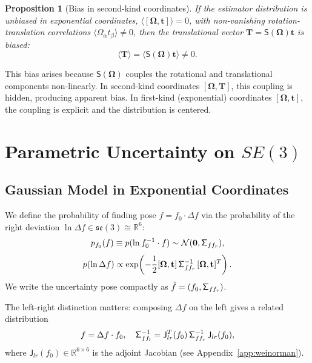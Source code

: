 \documentclass[journal]{IEEEtran}
\newcommand{\real}{\mathbb{R}}
\newcommand{\bfOmega}{\boldsymbol{\Omega}}
\newcommand{\sfSigma}[1]{\mathsf{\Sigma}_\mathnormal{#1}}
\newcommand{\beq}{\begin{equation}}
\newcommand{\eeq}{\end{equation}}
\newtheorem{proposition}{Proposition}
\begin{document}
\begin{proposition}[Bias in second-kind coordinates]
\label{prop:bias}
If the estimator distribution is unbiased in exponential 
coordinates, $\langle [\bfOmega, \mathbf{t}] \rangle = 0$, 
with non-vanishing rotation-translation correlations 
$\langle \Omega_\alpha t_\beta \rangle \neq 0$, then 
the translational vector $\mathbf{T} = \mathsf{S}(\bfOmega)\mathbf{t}$ 
is biased:
\beq
    \langle \mathbf{T} \rangle = 
    \langle \mathsf{S}(\bfOmega)\mathbf{t} \rangle \neq 0.
    \label{eq:biasmechanism}
\eeq
\end{proposition}

This bias arises because $\mathsf{S}(\bfOmega)$ couples 
the rotational and translational components non-linearly. 
In second-kind coordinates $[\bfOmega, \mathbf{T}]$, 
this coupling is hidden, producing apparent bias. 
In first-kind (exponential) coordinates $[\bfOmega, \mathbf{t}]$, 
the coupling is explicit and the distribution is centered.

\section{Parametric Uncertainty on $SE(3)$}
\label{sec:uncertainty}

\subsection{Gaussian Model in Exponential Coordinates}

We define the probability of finding pose $f = f_0 \cdot \Delta f$ 
via the probability of the right deviation 
$\ln \Delta f \in \mathfrak{se}(3) \cong \real^6$:
\beq
    p_{f_0}(f) \equiv p(\ln f_0^{-1} \cdot f) \sim 
    \mathcal{N}(\mathbf{0}, \sfSigma{ff_r}),
    \label{eq:gaussianSE3}
\eeq
\beq
    p(\ln \Delta f) \propto 
    \exp\!\left(-\frac{1}{2}[\bfOmega, \mathbf{t}]\,
    \sfSigma{ff_r}^{-1}\, [\bfOmega, \mathbf{t}]^T\right).
    \label{eq:gaussexplicit}
\eeq
We write the uncertainty pose compactly as 
$\hat{f} = (f_0, \sfSigma{ff_r})$.

The left-right distinction matters: composing 
$\Delta f$ on the left gives a related distribution
\beq
    f = \Delta f \cdot f_0,\quad
    \sfSigma{ff_l}^{-1} = \mathsf{J}_{lr}^T(f_0)\,
    \sfSigma{ff_r}^{-1}\, \mathsf{J}_{lr}(f_0),
    \label{eq:leftright}
\eeq
where $\mathsf{J}_{lr}(f_0) \in \real^{6 \times 6}$ is the 
adjoint Jacobian (see Appendix~\ref{app:weinorman}).
\end{document}
